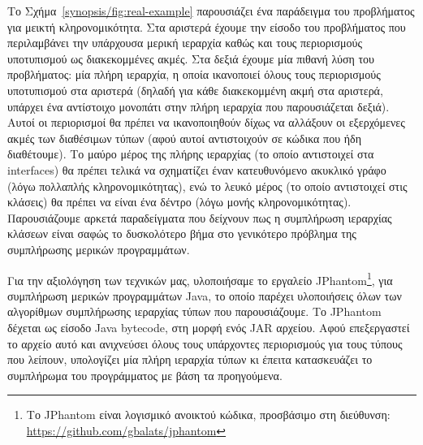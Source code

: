 Το Σχήμα~\ref{synopsis/fig:real-example} παρουσιάζει ένα παράδειγμα
του προβλήματος για μεικτή κληρονομικότητα. Στα αριστερά έχουμε την
είσοδο του προβλήματος που περιλαμβάνει την υπάρχουσα μερική ιεραρχία
καθώς και τους περιορισμούς υποτυπισμού ως διακεκομμένες ακμές. Στα
δεξιά έχουμε μία πιθανή λύση του προβλήματος: μία πλήρη ιεραρχία, η
οποία ικανοποιεί όλους τους περιορισμούς υποτυπισμού στα αριστερά
(δηλαδή για κάθε διακεκομμένη ακμή στα αριστερά, υπάρχει ένα
αντίστοιχο μονοπάτι στην πλήρη ιεραρχία που παρουσιάζεται δεξιά).
Αυτοί οι περιορισμοί θα πρέπει να ικανοποιηθούν δίχως να αλλάξουν οι
εξερχόμενες ακμές των διαθέσιμων τύπων (αφού αυτοί αντιστοιχούν σε
κώδικα που ήδη διαθέτουμε). Το μαύρο μέρος της πλήρης ιεραρχίας (το
οποίο αντιστοιχεί στα {\en interfaces}) θα πρέπει τελικά να σχηματίζει
έναν κατευθυνόμενο ακυκλικό γράφο (λόγω πολλαπλής κληρονομικότητας),
ενώ το λευκό μέρος (το οποίο αντιστοιχεί στις κλάσεις) θα πρέπει να
είναι ένα δέντρο (λόγω μονής κληρονομικότητας).
%
Παρουσιάζουμε αρκετά παραδείγματα που δείχνουν πως η συμπλήρωση
ιεραρχίας κλάσεων είναι σαφώς το δυσκολότερο βήμα στο γενικότερο
πρόβλημα της συμπλήρωσης μερικών προγραμμάτων.

Για την αξιολόγηση των τεχνικών μας, υλοποιήσαμε το εργαλείο {\en
  JPhantom}\footnote{Το {\en JPhantom} είναι λογισμικό ανοικτού
  κώδικα, προσβάσιμο στη διεύθυνση: {\en
    \url{https://github.com/gbalats/jphantom}}}, για συμπλήρωση
μερικών προγραμμάτων {\en Java}, το οποίο παρέχει υλοποιήσεις όλων των
αλγορίθμων συμπλήρωσης ιεραρχίας τύπων που παρουσιάζουμε. Το {\en
  JPhantom} δέχεται ως είσοδο {\en Java bytecode}, στη μορφή ενός {\en
  JAR} αρχείου. Αφού επεξεργαστεί το αρχείο αυτό και ανιχνεύσει όλους
τους υπάρχοντες περιορισμούς για τους τύπους που λείπουν, υπολογίζει
μία πλήρη ιεραρχία τύπων κι έπειτα κατασκευάζει το συμπλήρωμα του
προγράμματος με βάση τα προηγούμενα.

